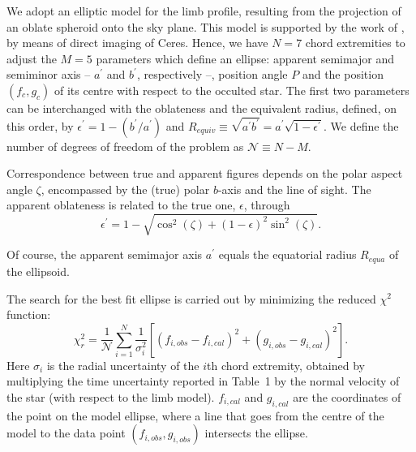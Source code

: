 \documentclass[useAMS,usenatbib]{mn2e}
\begin{document}
We adopt an elliptic model for the limb profile, resulting from the projection of an oblate spheroid onto the sky plane. This model is supported by the work of \cite{Drummond2014}, by means of direct imaging of Ceres. Hence, we have $N=7$ chord extremities to adjust the $M=5$ parameters which define an ellipse: apparent semimajor and semiminor axis -- $a^\prime$ and $b^\prime$, respectively --, position angle $P$ and the position $(f_c,g_c)$ of its centre with respect to the occulted star. The first two parameters can be interchanged with the oblateness and the equivalent radius, defined, on this order, by $\epsilon^\prime = 1 - (b^\prime/a^\prime)$ and $R_{equiv} \equiv \sqrt{a^\prime b^\prime} = a^\prime\sqrt{1-\epsilon^\prime}$. We define the number of degrees of freedom of the problem as $\mathcal{N} \equiv N - M$.

Correspondence between true and apparent figures depends on the polar aspect angle $\zeta$, encompassed by the (true) polar $b$-axis and the line of sight. The apparent oblateness is related to the true one, $\epsilon$, through
%
\begin{equation}
\epsilon^\prime = 1 - \sqrt{\cos^2(\zeta) + (1-\epsilon)^2\sin^2(\zeta)}.
\end{equation}

Of course, the apparent semimajor axis $a^\prime$ equals the equatorial radius $R_{equa}$ of the ellipsoid. %

The search for the best fit ellipse is carried out by minimizing the reduced $\chi^2$ function:
%
\begin{equation}
\chi^2_r = \frac{1}{\mathcal{N}} \sum_{i=1}^N \frac{1}{\sigma_i^2}  \left[ (f_{i,obs}-f_{i,cal})^2 + (g_{i,obs}-g_{i,cal})^2\right].
\end{equation}
%
Here $\sigma_i$ is the radial uncertainty of the $i$th chord extremity, obtained by multiplying the time uncertainty reported in Table~1 by the normal velocity of the star (with respect to the limb model). $f_{i,cal}$ and $g_{i,cal}$ are the coordinates of the point on the model ellipse, where a line that goes from the centre of the model to the data point $(f_{i,obs},g_{i,obs})$ intersects the ellipse.%
%
%
%
\end{document}

